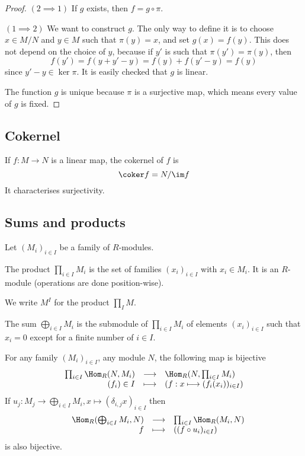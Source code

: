 \begin{proof}
    $(2 \implies 1)$ If $g$ exists, then $f=g\circ \pi$.

    $(1 \implies  2)$ We want to construct $g$. The only way to define it is to choose $x \in  M / N$ and $y \in  M$ such that $\pi(y)=x$, and set $g(x)=f(y)$. This does not depend on the choice of $y$, because if $y'$ is such that $\pi(y')=\pi(y)$, then \[f(y')=f(y+y'-y)=f(y)+f(y'-y)=f(y)\] since $y'-y \in  \ker \pi$. It is easily checked that $g$ is linear.

    The function $g$ is unique because $\pi$ is a surjective map, which means every value of $g$ is fixed.
\end{proof}

\subsection{Cokernel}

\begin{dfn}
    If $f : M \longrightarrow  N$ is a linear map, the cokernel of $f$ is \[\coker  f= N / \im f\]
    It characterises surjectivity.
\end{dfn}

\subsection{Sums and products }

Let $(M_i)_{i \in  I}$ be a family of $R$-modules.

\begin{dfn}
    The product $\prod_{i \in  I} M_i$ is the set of families $(x_i)_{i \in  I}$ with $x_i \in  M_i$. It is an $R$-module (operations are done position-wise).

We write $M^I$ for the product $\prod_I M$.
\end{dfn}


\begin{dfn}
    The sum $\bigoplus_{i \in  I} M_i$ is the submodule of $\prod_{i \in  I} M_i$ of elements $(x_i)_{i \in  I}$ such that $x_i=0$ except for a finite number of $i \in  I$.
\end{dfn}

\begin{prop}
For any family $(M_i)_{i \in  I}$, any module $N$, the following map is bijective \[
\begin{array}{rcl}
    \prod_{i \in  I}\Hom_R(N,M_i)  & \longrightarrow & \Hom_R(N, \prod_{i \in  I}M_i) \\
    (f_i) \in  I & \longmapsto & \displaystyle (f : x \longmapsto (f_i(x_i))_{i \in  I})
\end{array}
\] 
If $u_j : M_j \longrightarrow  \bigoplus_{i \in I}M_i, x \longmapsto (\delta_{i,j}x)_{i \in  I}$ then \[
\begin{array}{rrcl}
    & \Hom_R(\bigoplus_{i \in  I} M_i, N) & \longrightarrow & \prod_{i \in  I}\Hom_R(M_i, N) \\
    & f & \longmapsto & \displaystyle ((f\circ u_i)_{i \in  I})
\end{array}
\]  
is also bijective.
\end{prop}

